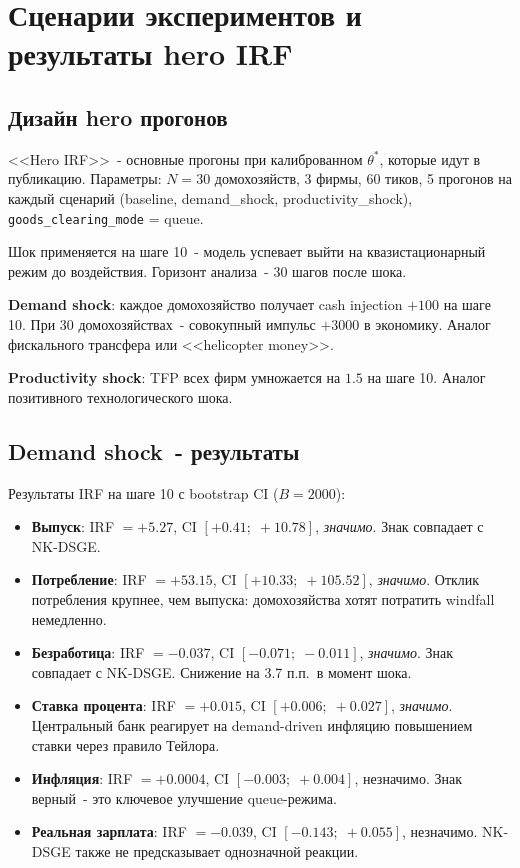 \documentclass[12pt, a4paper]{article}
\begin{document}
\section{Сценарии экспериментов и результаты hero IRF}

\subsection{Дизайн hero прогонов}

<<Hero IRF>>~- основные прогоны при калиброванном $\theta^*$, которые идут в публикацию. Параметры: $N = 30$ домохозяйств, 3 фирмы, 60 тиков, 5 прогонов на каждый сценарий (baseline, demand\_shock, productivity\_shock), \texttt{goods\_clearing\_mode} = queue.

Шок применяется на шаге 10~- модель успевает выйти на квазистационарный режим до воздействия. Горизонт анализа~- 30 шагов после шока.

\textbf{Demand shock}: каждое домохозяйство получает cash injection $+100$ на шаге 10. При 30 домохозяйствах~- совокупный импульс $+3000$ в экономику. Аналог фискального трансфера или <<helicopter money>>.

\textbf{Productivity shock}: TFP всех фирм умножается на $1.5$ на шаге 10. Аналог позитивного технологического шока.

\subsection{Demand shock~- результаты}

Результаты IRF на шаге 10 с bootstrap CI ($B = 2000$):

\begin{itemize}
  \item \textbf{Выпуск}: IRF $= +5.27$, CI $[+0.41;\; +10.78]$, \textit{значимо}. Знак совпадает с NK-DSGE.
  \item \textbf{Потребление}: IRF $= +53.15$, CI $[+10.33;\; +105.52]$, \textit{значимо}. Отклик потребления крупнее, чем выпуска: домохозяйства хотят потратить windfall немедленно.
  \item \textbf{Безработица}: IRF $= -0.037$, CI $[-0.071;\; -0.011]$, \textit{значимо}. Знак совпадает с NK-DSGE. Снижение на 3.7 п.п.\ в момент шока.
  \item \textbf{Ставка процента}: IRF $= +0.015$, CI $[+0.006;\; +0.027]$, \textit{значимо}. Центральный банк реагирует на demand-driven инфляцию повышением ставки через правило Тейлора.
  \item \textbf{Инфляция}: IRF $= +0.0004$, CI $[-0.003;\; +0.004]$, незначимо. Знак верный~- это ключевое улучшение queue-режима.
  \item \textbf{Реальная зарплата}: IRF $= -0.039$, CI $[-0.143;\; +0.055]$, незначимо. NK-DSGE также не предсказывает однозначной реакции.
\end{itemize}
\end{document}
